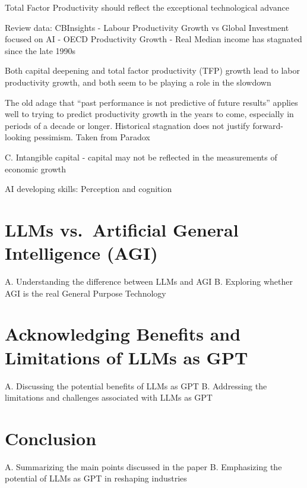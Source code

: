 \documentclass[preprint, 3p,
authoryear]{elsarticle} %
\begin{document}
Total Factor Productivity should reflect the exceptional technological
advance

Review data: CBInsights - Labour Productivity Growth vs Global
Investment focused on AI - OECD Productivity Growth - Real Median income
has stagnated since the late 1990s

Both capital deepening and total factor productivity (TFP) growth lead
to labor productivity growth, and both seem to be playing a role in the
slowdown

The old adage that ``past performance is not predictive of future
results'' applies well to trying to predict productivity growth in the
years to come, especially in periods of a decade or longer. Historical
stagnation does not justify forward-looking pessimism. Taken from
Paradox

C. Intangible capital - capital may not be reflected in the measurements
of economic growth

AI developing skills: Perception and cognition

\hypertarget{llms-vs.-artificial-general-intelligence-agi}{%
\section{LLMs vs.~Artificial General Intelligence
(AGI)}\label{llms-vs.-artificial-general-intelligence-agi}}

A. Understanding the difference between LLMs and AGI B. Exploring
whether AGI is the real General Purpose Technology

\hypertarget{acknowledging-benefits-and-limitations-of-llms-as-gpt}{%
\section{Acknowledging Benefits and Limitations of LLMs as
GPT}\label{acknowledging-benefits-and-limitations-of-llms-as-gpt}}

A. Discussing the potential benefits of LLMs as GPT B. Addressing the
limitations and challenges associated with LLMs as GPT

\hypertarget{conclusion}{%
\section{Conclusion}\label{conclusion}}

A. Summarizing the main points discussed in the paper B. Emphasizing the
potential of LLMs as GPT in reshaping industries
\end{document}
